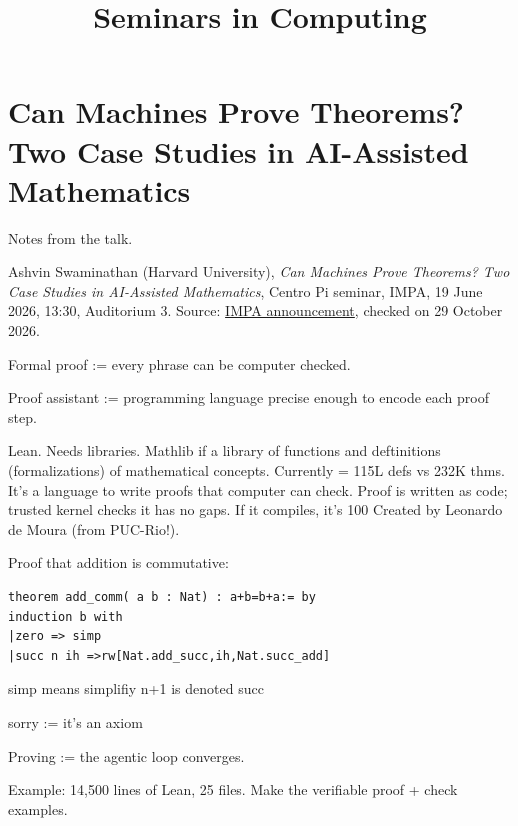 



\title{Seminars in Computing}
\maketitle

\label{section-phantom}

\tableofcontents

\section{Can Machines Prove Theorems?
Two Case Studies in AI-Assisted
Mathematics}
\label{section-swaminathan-ai-lean}

Notes from the talk.

Ashvin Swaminathan (Harvard University),
\emph{Can Machines Prove Theorems?
Two Case Studies in AI-Assisted
Mathematics}, Centro Pi seminar, IMPA,
19 June 2026, 13:30, Auditorium 3.
Source:
\href{https://seminarios.impa.br/%
visualizar/10500}{IMPA announcement},
checked on 29 October 2026.

\medskip

Formal proof :=
every phrase can be computer checked.

Proof assistant :=
programming language precise enough
to encode each proof step.

Lean. Needs libraries. 
Mathlib if a library of functions and
deftinitions (formalizations)
of mathematical concepts.
Currently = 115L defs vs 232K thms.
It's a language to write proofs that
computer can check.
Proof is written as code;
trusted kernel checks it has no gaps.
If it compiles, it's 100%
Created by Leonardo de Moura
(from PUC-Rio!).

Proof that addition is commutative:

\begin{verbatim}
theorem add_comm( a b : Nat) : a+b=b+a:= by
induction b with
|zero => simp
|succ n ih =>rw[Nat.add_succ,ih,Nat.succ_add]
\end{verbatim}

simp means simplifiy
n+1 is denoted succ

sorry := it's an axiom

Proving := the agentic loop converges.

Example: 14,500 lines of Lean, 25 files.
Make the verifiable proof + check examples.

